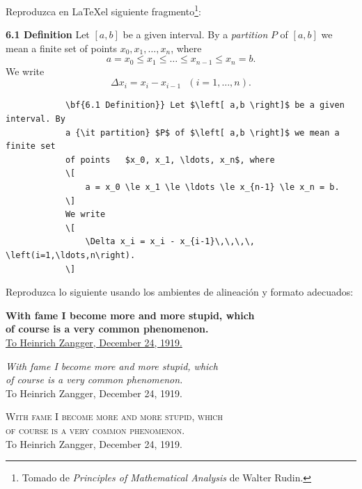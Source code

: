 \documentclass[12pt,letterpaper]{exam}
\begin{document}
\begin{questions}
\question[20] Reproduzca en \LaTeX el siguiente fragmento\footnote{Tomado de {\it Principles of Mathematical Analysis} de Walter Rudin.}: 
\begin{mdframed}[style=mystyle]
	\vspace{0.2cm}
	{\bf{6.1 Definition}} Let $\left[ a,b \right]$ be a given interval. By a {\it partition} $P$ of $\left[ a,b \right]$ we mean a finite set of points $x_0, x_1, \ldots, x_n$, where
	\[
		a = x_0 \le x_1 \le \ldots \le x_{n-1} \le x_n = b.
	\]
	We write
	\[
		\Delta x_i = x_i - x_{i-1}\,\,\,\, \left(i=1,\ldots,n\right).
	\]
	\vspace{0cm}
\end{mdframed}
	\begin{solution}
		\begin{verbatim}
			\bf{6.1 Definition}} Let $\left[ a,b \right]$ be a given interval. By 
			a {\it partition} $P$ of $\left[ a,b \right]$ we mean a finite set 
			of points	$x_0, x_1, \ldots, x_n$, where
			\[
				a = x_0 \le x_1 \le \ldots \le x_{n-1} \le x_n = b.
			\]
			We write
			\[
				\Delta x_i = x_i - x_{i-1}\,\,\,\, \left(i=1,\ldots,n\right).
			\]
		\end{verbatim}
	\end{solution}

\question[20] Reproduzca lo siguiente usando los ambientes de alineación y formato adecuados:

\begin{flushleft}
	{\bf With fame I become more and more stupid, which \\
	of course is a very common phenomenon.} \\
	\underline {To Heinrich Zangger, December 24, 1919.}
\end{flushleft}
	
\begin{center}
	{\it With fame I become more and more stupid, which \\
	of course is a very common phenomenon.} \\
	{\footnotesize To Heinrich Zangger, December 24, 1919.}
\end{center}

\begin{flushright}
	\textsc{ With fame I become more and more stupid, which \\
	of course is a very common phenomenon.} \\
	{\footnotesize To Heinrich Zangger, December 24, 1919.}
\end{flushright}


\end{questions}
\end{document}

